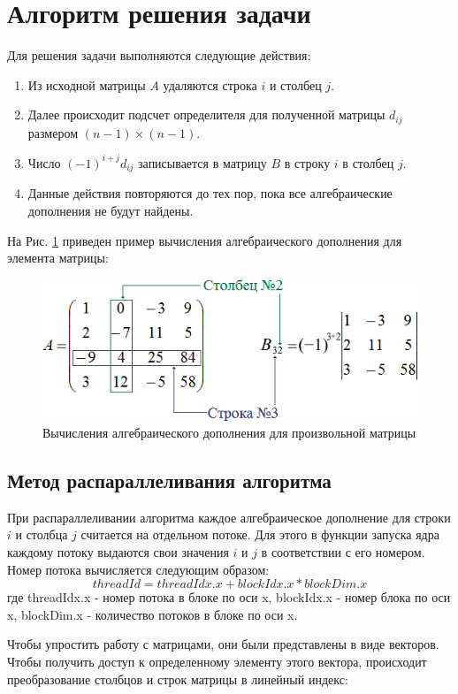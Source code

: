 \documentclass[a4paper, final]{article}
\begin{document}
\newpage
\section{Алгоритм решения задачи}
Для решения задачи выполняются следующие действия:
\begin{enumerate}
    \item Из исходной матрицы $A$ удаляются строка $i$ и столбец $j$.
    \item Далее происходит подсчет определителя для полученной матрицы $d_{ij}$ размером $(n-1) \times (n-1)$.
    \item Число $(-1)^{i+j} d_{ij}$ записывается в матрицу $B$ в строку $i$ в столбец $j$.
    \item Данные действия повторяются до тех пор, пока все алгебраические дополнения не будут найдены.
\end{enumerate}

На Рис. \ref{im3} приведен пример вычисления алгебраического дополнения для элемента матрицы:
\begin{figure}[H]
   \centering
   \includegraphics{im3.png}
   \caption{Вычисления алгебраического дополнения для произвольной матрицы}
   \label{im3}
\end{figure}


\subsection{Метод распараллеливания алгоритма}
При распараллеливании алгоритма каждое алгебраическое дополнение для строки $i$ и столбца $j$ считается на отдельном потоке. Для этого в функции запуска ядра каждому потоку выдаются свои значения $i$ и $j$ в соответствии с его номером. Номер потока вычисляется следующим образом: 
$$threadId = threadIdx.x + blockIdx.x * blockDim.x$$ 
где threadIdx.x - номер потока в блоке по оси x, 
blockIdx.x - номер блока по оси x,
blockDim.x - количество потоков в блоке по оси x.

Чтобы упростить работу с матрицами, они были представлены в виде векторов. Чтобы получить доступ к определенному элементу этого вектора, происходит преобразование столбцов и строк матрицы в линейный индекс:
\end{document}
